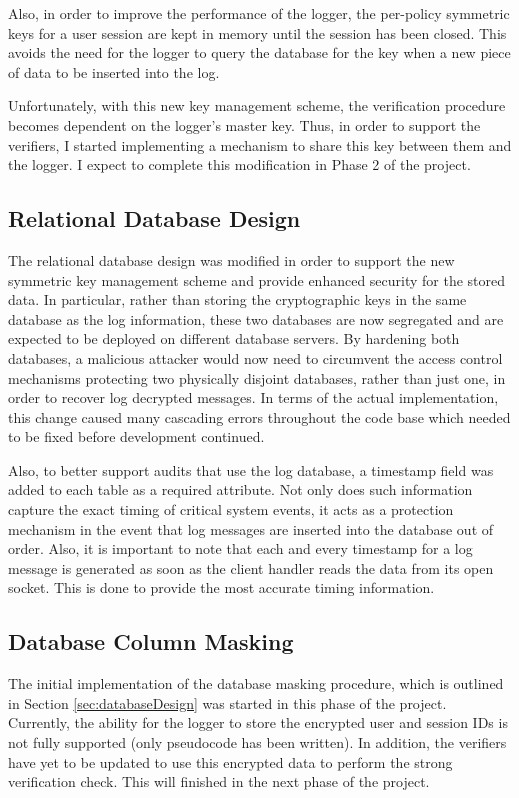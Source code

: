 \documentclass{sig-alternate}
\begin{document}
Also, in order to improve the performance of the logger, the per-policy symmetric keys for a user session are kept
in memory until the session has been closed. This avoids the need for the logger to query the database for the key 
when a new piece of data to be inserted into the log. 

Unfortunately, with this new key management scheme, the verification procedure becomes dependent on the
logger's master key. Thus, in order to support the verifiers, I started implementing a mechanism to share this key 
between them and the logger. I expect to complete this modification in Phase 2 of the project.

\subsection{Relational Database Design}
The relational database design was modified in order to support the new symmetric key management scheme and provide 
enhanced security for the stored data. In particular, rather than storing the cryptographic keys in the same database as the
log information, these two databases are now segregated and are expected to be deployed on different database servers.
By hardening both databases, a malicious attacker would now need to circumvent the access control 
mechanisms protecting two physically disjoint databases, rather than just one, in order to recover log 
decrypted messages. In terms of the actual implementation, this change caused many cascading errors 
throughout the code base which needed to be fixed before development continued.

Also, to better support audits that use the log database, a timestamp field was added to each table as a required
attribute. Not only does such information capture the exact timing of critical system events, it acts as a protection
mechanism in the event that log messages are inserted into the database out of order. Also, it is important to note that
each and every timestamp for a log message is generated as soon as the client handler reads the data from
its open socket. This is done to provide the most accurate timing information.


\subsection{Database Column Masking}
The initial implementation of the database masking procedure, which is outlined in Section \ref{sec:databaseDesign}
was started in this phase of the project. Currently, the ability for the logger to store the encrypted user and session IDs 
is not fully supported (only pseudocode has been written). In addition, the verifiers have yet to be updated to use 
this encrypted data to perform the strong verification check. This will finished in the next phase of the project.
\end{document}
